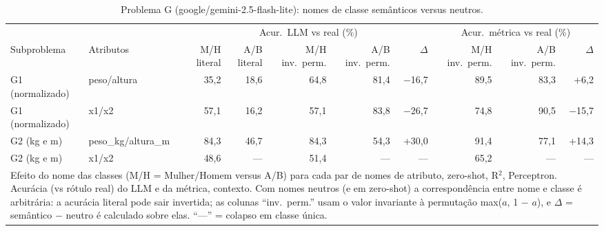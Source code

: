 \begin{table}[htbp]
\centering
\footnotesize
\caption{Problema G (google/gemini-2.5-flash-lite): nomes de classe semânticos versus neutros.}
\label{tab:bloco3_G_nomes_semanticos_vs_neutros_flashlite}
\begin{tabular}{llrrrrrrrr}
\toprule
 &  & \multicolumn{5}{c}{Acur.\ LLM vs real (\%)} & \multicolumn{3}{c}{Acur.\ métrica vs real (\%)} \\ \cmidrule(lr){3-7} \cmidrule(lr){8-10}
Subproblema & Atributos & M/H literal & A/B literal & M/H inv.\ perm. & A/B inv.\ perm. & $\Delta$ & M/H inv.\ perm. & A/B inv.\ perm. & $\Delta$ \\
\midrule
G1 (normalizado) & peso/altura & 35,2 & 18,6 & 64,8 & 81,4 & $-$16,7 & 89,5 & 83,3 & +6,2 \\
G1 (normalizado) & x1/x2 & 57,1 & 16,2 & 57,1 & 83,8 & $-$26,7 & 74,8 & 90,5 & $-$15,7 \\
\midrule
G2 (kg e m) & peso\_kg/altura\_m & 84,3 & 46,7 & 84,3 & 54,3 & +30,0 & 91,4 & 77,1 & +14,3 \\
G2 (kg e m) & x1/x2 & 48,6 & — & 51,4 & — & — & 65,2 & — & — \\
\bottomrule
\multicolumn{10}{p{0.95\linewidth}}{\footnotesize Efeito do nome das classes (M/H = Mulher/Homem versus A/B) para cada par de nomes de atributo, zero-shot, R$^2$, Perceptron. Acurácia (vs rótulo real) do LLM e da métrica, contexto. Com nomes neutros (e em zero-shot) a correspondência entre nome e classe é arbitrária: a acurácia literal pode sair invertida; as colunas ``inv.\ perm.'' usam o valor invariante à permutação max($a$, 1 $-$ $a$), e $\Delta$ = semântico $-$ neutro é calculado sobre elas. ``—'' = colapso em classe única.} \\
\end{tabular}
\end{table}
